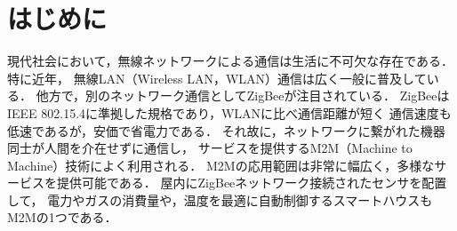 \documentclass[technicalreport]{ieicej}
\begin{document}
\maketitle

\section{はじめに}
\label{sec:intro}



現代社会において，無線ネットワークによる通信は生活に不可欠な存在である．
特に近年，
無線LAN（Wireless LAN，WLAN）通信は広く一般に普及している．
他方で，別のネットワーク通信としてZigBeeが注目されている．
ZigBeeはIEEE 802.15.4に準拠した規格であり，WLANに比べ通信距離が短く
通信速度も低速であるが，安価で省電力である．
それ故に，ネットワークに繋がれた機器同士が人間を介在せずに通信し，
サービスを提供するM2M（Machine to Machine）技術によく利用される．
M2Mの応用範囲は非常に幅広く，多様なサービスを提供可能である．
屋内にZigBeeネットワーク接続されたセンサを配置して，
電力やガスの消費量や，温度を最適に自動制御するスマートハウスもM2Mの1つである．
\end{document}
